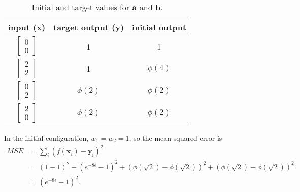 \documentclass{article}
\renewcommand\vec{\mathbf}
\begin{document}
\begin{table}[h!]
    \centering
    \begin{tabular}{c|c|c}
        input ($\vec{x}$) & target output ($\vec{y}$) & initial output \\
        \hline
        $\begin{bmatrix} 0 \\ 0 \end{bmatrix}$
        & 1 & 1
        \\
        $\begin{bmatrix} 2 \\ 2 \end{bmatrix}$
        & 1 & $\phi\left( 4 \right)$
        \\
        $\begin{bmatrix} 0 \\ 2 \end{bmatrix}$
        & $\phi\left( 2 \right)$ & $\phi\left( 2 \right)$
        \\
        $\begin{bmatrix} 2 \\ 0 \end{bmatrix}$
        & $\phi\left(2 \right)$ & $\phi\left( 2 \right)$
    \end{tabular}
    \caption{Initial and target values for $\vec{a}$ and $\vec{b}$.}
    \label{table:week11:dataset}
\end{table}

In the initial configuration, $w_1=w_2=1$, so the mean squared error is
\begin{align*}
    MSE &= \sum_i{\left(f(\vec{x}_i) - \vec{y}_i\right)^2}
    \\ &= \left(1 - 1 \right)^2 + \left(e^{-8\epsilon} - 1 \right)^2 + \left(\phi\left( \sqrt{2} \right) - \phi\left( \sqrt{2} \right) \right)^2 + \left(\phi\left( \sqrt{2} \right) - \phi\left( \sqrt{2} \right) \right)^2.
    \\ &= \left(e^{-8\epsilon} - 1 \right)^2.
\end{align*}
\end{document}

